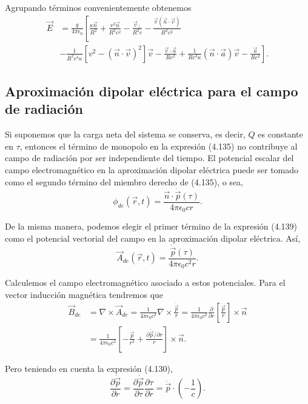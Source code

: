 \documentclass[12pt,a4paper]{book}
\begin{document}
Agrupando términos convenientemente obtenemos
\begin{align}
\vec{E} &= \frac{q}{4\pi\epsilon_0}\left[\frac{\kappa\vec{n}}{R^2} + \frac{v^2\vec{n}}{R^2c^2} - \frac{\vec{v}_{\perp}}{R^2c} - \frac{\vec{v}(\vec{n} \cdot \vec{v})}{R^2c^2} \right. \nonumber \\
&\left. -\frac{1}{R^2c^3\kappa}[v^2 - (\vec{n} \cdot \vec{v})^2]\vec{v} - \frac{\vec{v} \cdot \vec{a}}{Rc^2} + \frac{1}{Rc^3\kappa}(\vec{n} \cdot \vec{a})\vec{v} - \frac{\vec{a}}{Rc^2}\right].
\end{align}

\subsection{Aproximación dipolar eléctrica para el campo de radiación}

Si suponemos que la carga neta del sistema se conserva, es decir, $Q$ es constante en $\tau$, entonces el término de monopolo en la expresión (4.135) no contribuye al campo de radiación por ser independiente del tiempo. El potencial escalar del campo electromagnético en la aproximación dipolar eléctrica puede ser tomado como el segundo término del miembro derecho de (4.135), o sea,
\begin{equation}
\phi_{de}(\vec{r}, t) = \frac{\vec{n} \cdot \dot{\vec{p}}(\tau)}{4\pi\epsilon_0 cr}.
\end{equation}

De la misma manera, podemos elegir el primer término de la expresión (4.139) como el potencial vectorial del campo en la aproximación dipolar eléctrica. Así,
\begin{equation}
\vec{A}_{de}(\vec{r}, t) = \frac{\dot{\vec{p}}(\tau)}{4\pi\epsilon_0 c^2 r}.
\end{equation}

Calculemos el campo electromagnético asociado a estos potenciales. Para el vector inducción magnética tendremos que
\begin{align}
\vec{B}_{de} &= \nabla \times \vec{A}_{de} = \frac{1}{4\pi\epsilon_0 c^2} \nabla \times \frac{\dot{\vec{p}}}{r} = \frac{1}{4\pi\epsilon_0 c^2} \frac{\partial}{\partial r}\left[\frac{\dot{\vec{p}}}{r}\right] \times \vec{n} \nonumber \\
&= \frac{1}{4\pi\epsilon_0 c^2} \left[-\frac{\dot{\vec{p}}}{r^2} + \frac{\partial \dot{\vec{p}}/\partial r}{r}\right] \times \vec{n}.
\end{align}

Pero teniendo en cuenta la expresión (4.130),
\begin{equation}
\frac{\partial \dot{\vec{p}}}{\partial r} = \frac{\partial \dot{\vec{p}}}{\partial \tau}\frac{\partial \tau}{\partial r} = \ddot{\vec{p}} \cdot \left(-\frac{1}{c}\right).
\end{equation}
\end{document}
